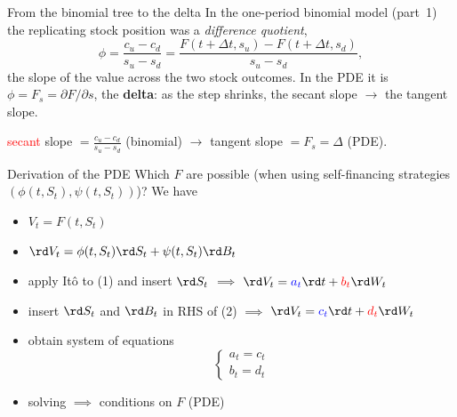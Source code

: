 \documentclass[pdf, handout]{beamer}
\begin{document}
\begin{frame}{From the binomial tree to the delta}
In the one-period binomial model (part~1) the replicating stock position was a \emph{difference quotient},
\[ \phi=\frac{c_u-c_d}{s_u-s_d}=\frac{F(t+\Delta t,s_u)-F(t+\Delta t,s_d)}{s_u-s_d}, \]
the slope of the value across the two stock outcomes. In the PDE it is $\phi=F_s=\partial F/\partial s$, the \textbf{delta}: as the step shrinks, the secant slope $\to$ the tangent slope.
\begin{center}
\end{center}
\vspace{-3mm}
{\small \textcolor{red}{secant} slope $=\frac{c_u-c_d}{s_u-s_d}$ (binomial) $\longrightarrow$ \textcolor{green!55!black}{tangent} slope $=F_s=\Delta$ (PDE).}
\end{frame}

\begin{frame}{Derivation of the PDE}
Which $F$ are possible (when using self-financing strategies $(\phi(t,S_t),\psi(t,S_t))$)?
We have
\begin{itemize}
\item[(1)] $V_t=F(t,S_t)$
\item[(2)] $\rd V_t= \phi(t,S_t) \rd S_t + \psi(t,S_t) \rd B_t$
\end{itemize}
\vspace{-.2cm}
\begin{itemize}
\item apply It\^{o} to (1) and insert $\rd S_t$  $\implies$
$
\rd V_t=\textcolor{blue}{a_t} \rd t + \textcolor{red}{b_t} \rd W_t
$
\item insert $\rd S_t$ and $\rd B_t$ in RHS of (2) $\implies$
$\rd V_t=\textcolor{blue}{c_t} \rd t + \textcolor{red}{d_t} \rd W_t$
\item obtain system of equations
\[
\left\{
  \begin{array}{ll}
    a_t=c_t  \\
    b_t=d_t %
  \end{array}
\right.
\]
\item solving $\implies$ conditions on $F$ (PDE)
\end{itemize}
\end{frame}
\end{document}
